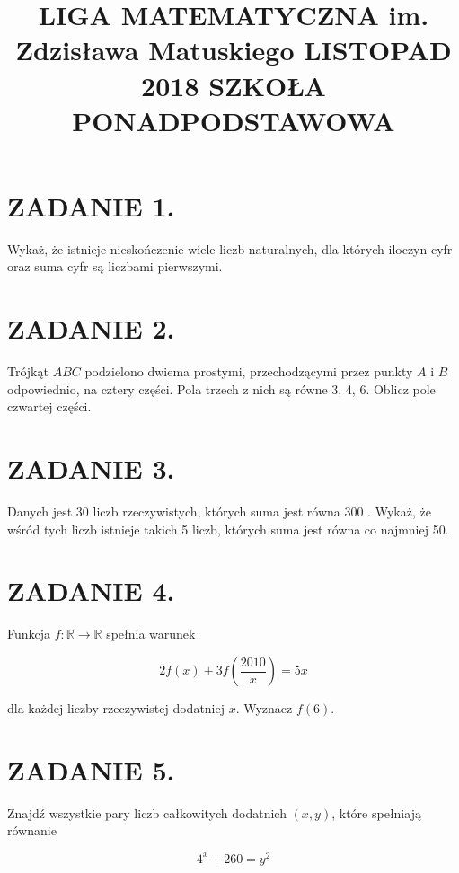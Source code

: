 \documentclass[10pt]{article}
\title{LIGA MATEMATYCZNA im. Zdzisława Matuskiego LISTOPAD 2018 SZKOŁA PONADPODSTAWOWA }
\author{}
\date{}
\begin{document}
\maketitle
\section*{ZADANIE 1.}
Wykaż, że istnieje nieskończenie wiele liczb naturalnych, dla których iloczyn cyfr oraz suma cyfr są liczbami pierwszymi.

\section*{ZADANIE 2.}
Trójkąt \(A B C\) podzielono dwiema prostymi, przechodzącymi przez punkty \(A\) i \(B\) odpowiednio, na cztery części. Pola trzech z nich są równe 3, 4, 6. Oblicz pole czwartej części.

\section*{ZADANIE 3.}
Danych jest 30 liczb rzeczywistych, których suma jest równa 300 . Wykaż, że wśród tych liczb istnieje takich 5 liczb, których suma jest równa co najmniej 50.

\section*{ZADANIE 4.}
Funkcja \(f: \mathbb{R} \rightarrow \mathbb{R}\) spełnia warunek

\[
2 f(x)+3 f\left(\frac{2010}{x}\right)=5 x
\]

dla każdej liczby rzeczywistej dodatniej \(x\). Wyznacz \(f(6)\).

\section*{ZADANIE 5.}
Znajdź wszystkie pary liczb całkowitych dodatnich \((x, y)\), które spełniają równanie

\[
4^{x}+260=y^{2}
\]
\end{document}
